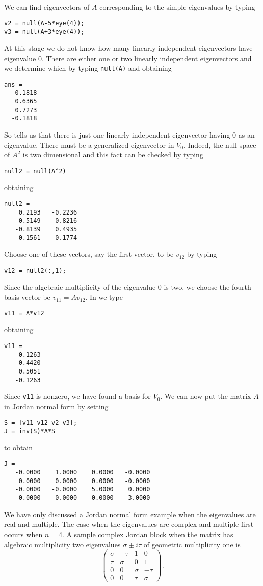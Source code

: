We can find eigenvectors of $A$ corresponding to the simple
eigenvalues by typing
\begin{verbatim}
v2 = null(A-5*eye(4));
v3 = null(A+3*eye(4));
\end{verbatim}
At this stage we do not know how many linearly independent
eigenvectors have eigenvalue $0$.  There are either one or two linearly
independent eigenvectors and we determine which by typing {\tt null(A)} 
and obtaining
\begin{verbatim}
ans =
  -0.1818
   0.6365
   0.7273
  -0.1818
\end{verbatim}
So \Matlab tells us that there is just one linearly independent
eigenvector having $0$ as an eigenvalue.  There must be a generalized
eigenvector
in $V_0$.  Indeed, the null space of $A^2$ is two dimensional
and this fact can be checked by typing
\begin{verbatim}
null2 = null(A^2)
\end{verbatim}
obtaining
\begin{verbatim}
null2 =
    0.2193   -0.2236
   -0.5149   -0.8216
   -0.8139    0.4935
    0.1561    0.1774
\end{verbatim}
Choose one of these vectors, say the first vector, to be $v_{12}$ by typing
\begin{verbatim}
v12 = null2(:,1);
\end{verbatim}
Since the algebraic multiplicity
of the eigenvalue $0$ is two, we choose the 
fourth basis vector be $v_{11}=Av_{12}$.  In \Matlab we type 
\begin{verbatim}
v11 = A*v12
\end{verbatim}
obtaining
\begin{verbatim}
v11 =
   -0.1263
    0.4420
    0.5051
   -0.1263
\end{verbatim}
Since {\tt v11} is nonzero, we have found a basis for $V_0$.
We can now put the matrix $A$ in Jordan normal 
form
by setting 
\begin{verbatim}
S = [v11 v12 v2 v3];
J = inv(S)*A*S
\end{verbatim}
to obtain
\begin{verbatim}
J = 
   -0.0000    1.0000    0.0000   -0.0000
    0.0000    0.0000    0.0000   -0.0000
   -0.0000   -0.0000    5.0000    0.0000
    0.0000   -0.0000   -0.0000   -3.0000
\end{verbatim}

We have only discussed a Jordan normal form example when the eigenvalues
are real and multiple.  The case when the eigenvalues are complex and 
multiple first occurs when $n=4$. 
A sample complex Jordan block when the 
matrix has algebraic multiplicity two eigenvalues $\sigma\pm i\tau$ of 
geometric multiplicity one is
\[
\left(\begin{array}{rrrr} \sigma & -\tau & 1 & 0 \\ 
\tau & \sigma & 0 & 1 \\ 0 & 0 & \sigma & -\tau \\
0 & 0 & \tau & \sigma \end{array}\right).
\]

